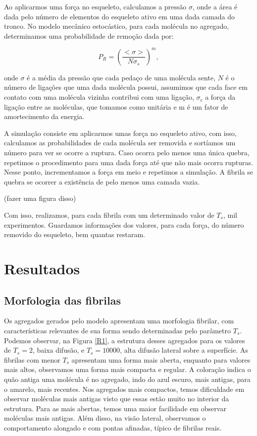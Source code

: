 \documentclass{article}
\begin{document}
Ao aplicarmos uma força no esqueleto, calculamos a pressão $\sigma$, onde a área é dada pelo número de elementos do esqueleto ativo em uma dada camada do tronco. No modelo mecânico estocástico, para cada molécula no agregado, determinamos uma probabilidade de remoção dada por:

\begin{equation}
    P_{R} = (\frac{<\sigma>}{N\sigma_{s}})^{m},
\end{equation}

\noindent onde $\sigma$ é a média da pressão que cada pedaço de uma molécula sente, $N$ é o número de ligações que uma dada molécula possui, assumimos que cada face em contato com uma molécula vizinha contribui com uma ligação, $\sigma_{c}$ a força da ligação entre as moléculas, que tomamos como unitária e m é um fator de amortecimento da energia\cite{Parkinson1997,2013}.

A simulação consiste em aplicarmos umas força no esqueleto ativo, com isso, calculamos as probabilidades de cada molécula ser removida e sortíamos um número para ver se ocorre a ruptura. Caso ocorra pelo menos uma única quebra, repetimos o procedimento para uma dada força até que não mais ocorra rupturas. Nesse ponto, incrementamos a força em meio e repetimos a simulação. A fibrila se quebra se ocorrer a existência de pelo menos uma camada vazia.

(fazer uma figura disso)

Com isso, realizamos, para cada fibrila com um determinado valor de $T_{s}$, mil experimentos. Guardamos informações dos valores, para cada força, do número removido do esqueleto, bem quantas restaram.

\section{Resultados}

\subsection{Morfologia das fibrilas}

Os agregados gerados pelo modelo apresentam uma morfologia fibrilar, com características relevantes de sua forma 
sendo determinadas pelo parâmetro \(T_{s}\). Podemos observar, na Figura \ref{R1}, a estrutura desses agregados 
para os valores de \(T_{s} = 2\), baixa difusão, e \(T_{s} = 10000\), alta difusão lateral sobre a superfície. As 
fibrilas com menor \(T_{s}\) apresentam uma forma mais aberta, enquanto para valores mais altos, observamos uma 
forma mais compacta e regular. A coloração indica o quão antiga uma molécula é no agregado, indo do azul escuro, 
mais antigas, para o amarelo, mais recentes. Nos agregados mais compactos, temos dificuldade em observar moléculas
mais antigas visto que essas estão muito no interior da estrutura. Para as mais abertas, temos uma maior facilidade
em observar moléculas mais antigas. Além disso, na visão lateral, observamos o comportamento alongado e com pontas 
afinadas, típico de fibrilas reais. 
\end{document}
